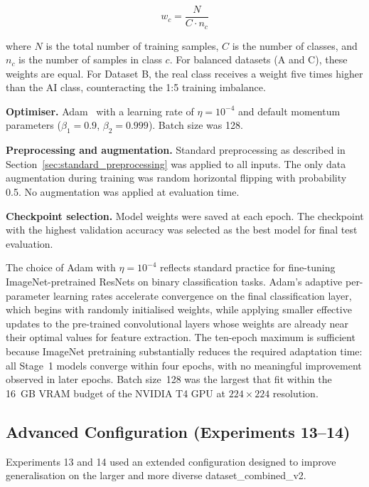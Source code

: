 \begin{equation}
  w_c = \frac{N}{C \cdot n_c}
  \label{eq:class_weight}
\end{equation}

where $N$ is the total number of training samples, $C$ is the number of classes, and $n_c$ is
the number of samples in class $c$. For balanced datasets (A and C), these weights are equal.
For Dataset B, the real class receives a weight five times higher than the AI class,
counteracting the 1:5 training imbalance.

\textbf{Optimiser.} Adam~\cite{kingma2015adam} with a learning rate of $\eta = 10^{-4}$ and default momentum
parameters ($\beta_1 = 0.9$, $\beta_2 = 0.999$). Batch size was 128.

\textbf{Preprocessing and augmentation.} Standard preprocessing as described in
Section~\ref{sec:standard_preprocessing} was applied to all inputs. The only data augmentation
during training was random horizontal flipping with probability 0.5. No augmentation was applied
at evaluation time.

\textbf{Checkpoint selection.} Model weights were saved at each epoch. The checkpoint with the
highest validation accuracy was selected as the best model for final test evaluation.

The choice of Adam with $\eta = 10^{-4}$ reflects standard practice for fine-tuning
ImageNet-pretrained ResNets on binary classification tasks. Adam's adaptive per-parameter
learning rates accelerate convergence on the final classification layer, which begins with
randomly initialised weights, while applying smaller effective updates to the pre-trained
convolutional layers whose weights are already near their optimal values for feature
extraction. The ten-epoch maximum is sufficient because ImageNet pretraining substantially
reduces the required adaptation time: all Stage~1 models converge within four epochs, with
no meaningful improvement observed in later epochs. Batch size~128 was the largest that
fit within the 16~GB VRAM budget of the NVIDIA T4 GPU at $224\times224$ resolution.

\subsection{Advanced Configuration (Experiments 13--14)}
\label{sec:advanced_config}

Experiments 13 and 14 used an extended configuration designed to improve generalisation on the
larger and more diverse dataset\_combined\_v2.

